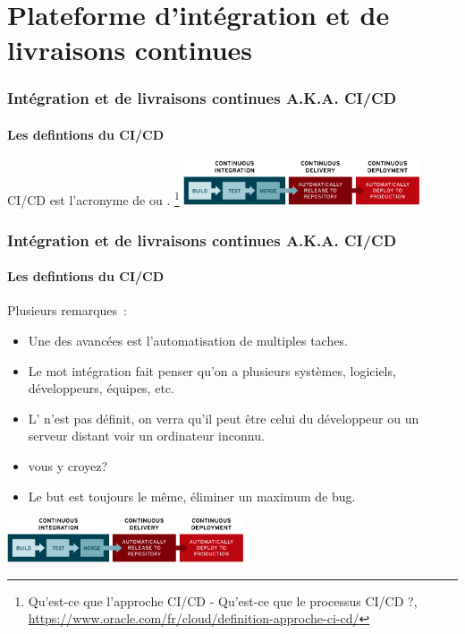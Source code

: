 \documentclass{beamer}
\begin{document}
    \section{Plateforme d’intégration et de livraisons continues}

    \begin{frame}
        \frametitle{Intégration et de livraisons continues A.K.A. CI/CD}
        \framesubtitle{Les defintions du CI/CD}
        \transdissolve
        CI/CD est l'acronyme de  ou .
        \bigbreak
        \footnote{Qu'est-ce que l'approche CI/CD - Qu’est-ce que le processus CI/CD ?, \url{https://www.oracle.com/fr/cloud/definition-approche-ci-cd/}}
        \bigbreak
        \centering
        \includegraphics[width=7cm]{image/ci-cd-flow.png}
    \end{frame}

    \begin{frame}
        \frametitle{Intégration et de livraisons continues A.K.A. CI/CD}
        \framesubtitle{Les defintions du CI/CD}
        \transdissolve
        Plusieurs remarques~:
        \begin{itemize}
            \item Une des avancées est l'automatisation de multiples taches.
            \item Le mot intégration fait penser qu'on a plusieurs systèmes, logiciels, développeurs, équipes, etc.
            \item L' n'est pas définit, on verra qu'il peut être celui du développeur ou un serveur distant voir un ordinateur inconnu.
            \item {} vous y croyez?
            \item Le but est toujours le même, éliminer un maximum de bug.
        \end{itemize}
        \bigbreak
        \centering
        \includegraphics[width=7cm]{image/ci-cd-flow.png}
    \end{frame}
\end{document}
